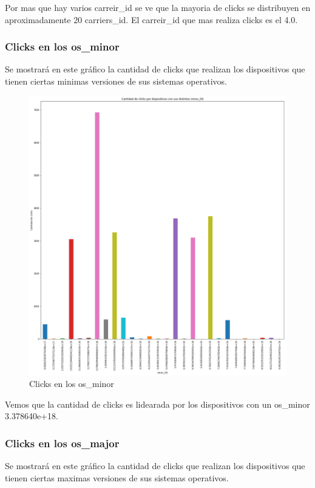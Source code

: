 \documentclass[a4paper, 12pt]{article}
\newcommand\tab[1][1cm]{\hspace*{#1}}
\begin{document}
		\tab Por mas que hay varios carreir_id se ve que la mayoria de clicks se distribuyen en aproximadamente 20 carriers_id. El carreir_id que mas realiza clicks es el 4.0.

	\subsubsection{Clicks en los os_minor}
		\tab Se mostrará en este gráfico la cantidad de clicks que realizan los dispositivos que tienen ciertas minimas versiones de sus sistemas operativos.

		\FloatBarrier
		\begin{figure}[h]
			\centering
			\includegraphics[width=\textwidth]{images/clicks/clicks_minor_OS.png}
			\caption{Clicks en los os_minor}
		\end{figure}
		\FloatBarrier

		\tab Vemos que la cantidad de clicks es lidearada por los dispositivos con un os_minor 3.378640e+18.

	\subsubsection{Clicks en los os_major}
		\tab Se mostrará en este gráfico la cantidad de clicks que realizan los dispositivos que tienen ciertas maximas versiones de sus sistemas operativos.
\end{document}
